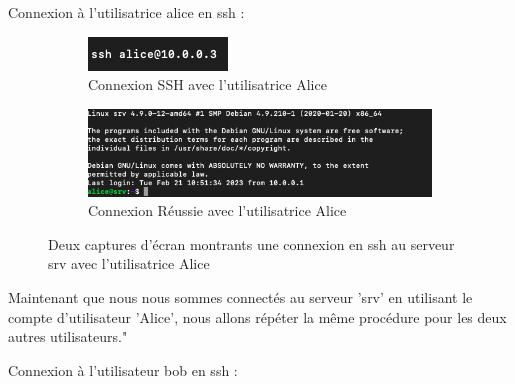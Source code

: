 \documentclass[12pt]{article}
\begin{document}
\vspace{0.3cm}

Connexion à l'utilisatrice alice en ssh  : 

\vspace{0.3cm}

\begin{figure}[h]
  \centering
  \begin{subfigure}{0.30\textwidth}
    \centering
    \includegraphics[width=\textwidth]{Images-Client-SSH/Image-TD-SSH-1/SSH-Alice.png}
    \caption{Connexion SSH avec l'utilisatrice Alice}
  \end{subfigure}
  \vspace{0.9cm} %
  \begin{subfigure}{0.45\textwidth}
    \centering
    \includegraphics[width=\textwidth]{Images-Client-SSH/Image-TD-SSH-1/Connexion-SSH-Alice.png}
    \caption{Connexion Réussie avec l'utilisatrice Alice}
  \end{subfigure}
  \caption{Deux captures d'écran montrants une connexion en ssh au serveur srv avec l'utilisatrice Alice}
\end{figure}

\vspace{0.3cm}

Maintenant que nous nous sommes connectés au serveur 'srv' en utilisant le compte d'utilisateur 'Alice', nous allons répéter la même procédure pour les deux autres utilisateurs."

\vspace{0.3cm}

\newpage

\vspace{0.3cm}

Connexion à l'utilisateur bob en ssh  : 
\end{document}
